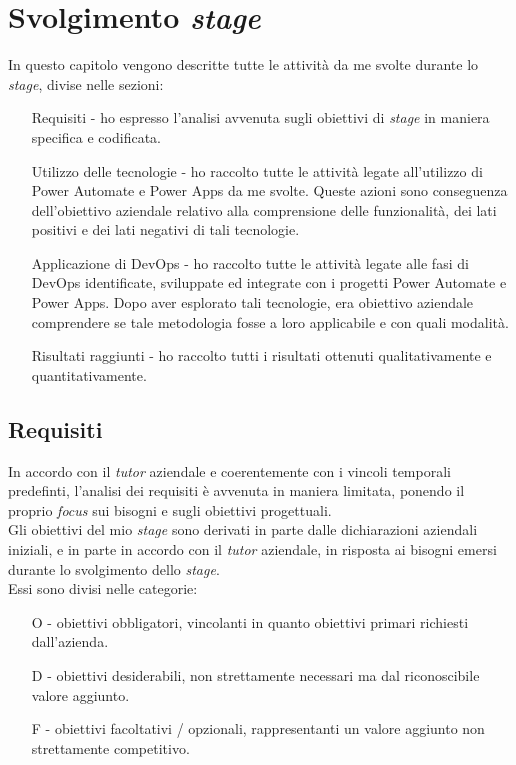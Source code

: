 \chapter{Svolgimento \emph{stage}}
\label{cap:svolgimentoStage}
In questo capitolo vengono descritte tutte le attività da me svolte durante lo \emph{stage}, divise nelle sezioni:
\begin{enumerate}
	\item[Requisiti -]ho espresso l'analisi avvenuta sugli obiettivi di \emph{stage} in maniera specifica e codificata.
    \item[Utilizzo delle tecnologie - ]ho raccolto tutte le attività legate all'utilizzo di Power Automate e Power Apps da me svolte. Queste azioni sono conseguenza dell'obiettivo aziendale relativo alla comprensione delle funzionalità, dei lati positivi e dei lati negativi di tali tecnologie.
    \item[Applicazione di DevOps -]ho raccolto tutte le attività legate alle fasi di DevOps identificate, sviluppate ed integrate con i progetti Power Automate e Power Apps. Dopo aver esplorato tali tecnologie, era obiettivo aziendale comprendere se tale metodologia fosse a loro applicabile e con quali modalità.
    \item[Risultati raggiunti - ]ho raccolto tutti i risultati ottenuti qualitativamente e quantitativamente.
\end{enumerate}

\section{Requisiti}%
In accordo con il \emph{tutor} aziendale e coerentemente con i vincoli temporali predefinti, l'analisi dei requisiti è avvenuta in maniera limitata, ponendo il proprio \emph{focus} sui bisogni e sugli obiettivi progettuali.\\
Gli obiettivi del mio \emph{stage} sono derivati in parte dalle dichiarazioni aziendali iniziali, e in parte in accordo con il \emph{tutor} aziendale, in risposta ai bisogni emersi durante lo svolgimento dello \emph{stage}.\\
Essi sono divisi nelle categorie:
\begin{enumerate}
	\item[O -]obiettivi obbligatori, vincolanti in quanto obiettivi primari richiesti dall'azienda.
    \item[D -]obiettivi desiderabili, non strettamente necessari ma dal riconoscibile valore aggiunto.
    \item[F -]obiettivi facoltativi / opzionali, rappresentanti un valore aggiunto non strettamente competitivo.
\end{enumerate}

